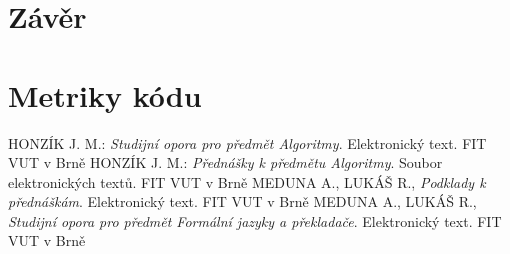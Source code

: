 \documentclass[12pt,a4paper,titlepage,final]{article}
\begin{document}
\section{Závěr} \label{zaver}

\appendix

\section{Metriky kódu} \label{metriky}

\begin{thebibliography}{1}

HONZÍK J. M.: \emph{Studijní opora pro předmět Algoritmy}. Elektronický text. FIT VUT v Brně
HONZÍK J. M.: \emph{Přednášky k předmětu Algoritmy}. Soubor elektronických textů. FIT VUT v Brně
MEDUNA A., LUKÁŠ R., \emph{Podklady k přednáškám}. Elektronický text. FIT VUT v Brně
MEDUNA A., LUKÁŠ R., \emph{Studijní opora pro předmět Formální jazyky a překladače}. Elektronický text. FIT VUT v Brně


\end{thebibliography}
\appendix
\end{document}
